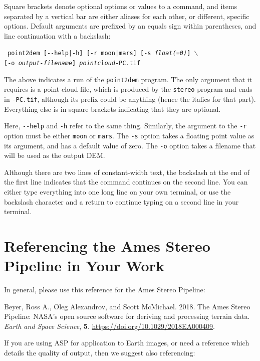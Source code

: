 Square brackets denote optional options or values to a command, and
items separated by a vertical bar are either aliases for each other, or
different, specific options.  Default arguments are prefixed by an equals
sign within parentheses, and line continuation with a backslash:

\texttt{  point2dem [-\/-help|-h] [-r moon|mars] [-s \textit{float(=0)}] $\backslash$ } \\
\hspace*{6em}\texttt{[-o \textit{output-filename}] \textit{pointcloud}-PC.tif}

The above indicates a run of the \texttt{point2dem} program.  The
only argument that it requires is a point cloud file, which is
produced by the \texttt{stereo} program and ends in \texttt{-PC.tif},
although its prefix could be anything (hence the italics for that
part).  Everything else is in square brackets indicating that they
are optional.

Here, \texttt{-\/-help} and \texttt{-h} refer to the same
thing. Similarly, the argument to the \texttt{-r} option must be either
\texttt{moon} or \texttt{mars}.  The \texttt{-s} option takes a floating
point value as its argument, and has a default value of zero.  The
\texttt{-o} option takes a filename that will be used as the output
\ac{DEM}.

Although there are two lines of constant-width text, the backslash at
the end of the first line indicates that the command continues on the
second line. You can either type everything into one long line on your
own terminal, or use the backslash character and a return to continue
typing on a second line in your terminal.


\section{Referencing the Ames Stereo Pipeline in Your Work}

In general, please use this reference for the Ames Stereo Pipeline:

\begin{description}
		\item Beyer, Ross A., Oleg Alexandrov, and Scott McMichael. 2018. The Ames Stereo Pipeline: NASA's open source software for deriving and processing terrain data. \textit{Earth and Space Science}, \textbf{5}. \url{https://doi.org/10.1029/2018EA000409}{}.
\end{description}

If you are using ASP for application to Earth images, or need a reference which details the quality 
of output, then we suggest also referencing:

